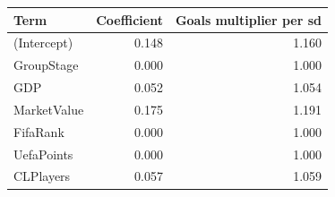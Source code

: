 
\begin{tabular}{lrr}
\toprule
Term & Coefficient & Goals multiplier per sd\\
\midrule
(Intercept) & 0.148 & 1.160\\
GroupStage & 0.000 & 1.000\\
GDP & 0.052 & 1.054\\
MarketValue & 0.175 & 1.191\\
FifaRank & 0.000 & 1.000\\
UefaPoints & 0.000 & 1.000\\
CLPlayers & 0.057 & 1.059\\
\bottomrule
\end{tabular}
